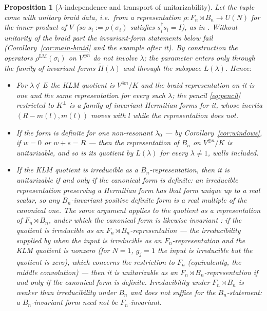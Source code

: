 \documentclass[11pt]{article}
\newtheorem{proposition}[theorem]{Proposition}
\theoremstyle{definition}
\newcommand{\Ht}{\widetilde H}
\begin{document}
\begin{proposition}[$\lambda$-independence and transport of unitarizability]
\label{prop:transport}
Let the tuple come with unitary braid data, i.e.\ from a
representation $\rho\colon F_n\rtimes B_n\to U(N)$ for the inner
product of $V$ (so $s_i:=\rho(\sigma_i)$ satisfies
$s_i^{\dagger}s_i=I$), as in \cite[Definitions~8 and 10, Lemma~3]{N-KLM}.
Without unitarity of the braid part the invariant-form statements
below fail (Corollary~\ref{cor:main-braid} and the example after it). By
construction the operators $\rho^{\mathrm{LM}}(\sigma_i)$ on
$V^{\oplus n}$ do not involve $\lambda$; the parameter enters only
through the family of invariant forms $\Ht(\lambda)$ and through the
subspace $L(\lambda)$. Hence:
\begin{itemize}
\item[(i)] For $\lambda\notin E$ the KLM quotient is $V^{\oplus n}/K$
and the braid representation on it is one and the same representation
for every such $\lambda$; the pencil \eqref{eq:pencil} restricted to
$K^{\perp}$ is a family of invariant Hermitian forms for it, whose
inertia $(R-m(l),m(l))$ moves with $l$ while the representation does not.
\item[(ii)] If the form is definite for one non-resonant $\lambda_0$
--- by Corollary~\ref{cor:windows}, if $w=0$ or $w+s=R$ --- then the
representation of $B_n$ on $V^{\oplus n}/K$ is unitarizable, and so is
its quotient by $L(\lambda)$ for every $\lambda\neq1$, walls included.
\item[(iii)] If the KLM quotient is irreducible \emph{as a
$B_n$-representation}, then it is unitarizable if and only if the
canonical form is definite: an irreducible representation preserving
a Hermitian form has that form unique up to a real scalar, so any
$B_n$-invariant positive definite form is a real multiple of the
canonical one. The same argument applies to the quotient as a
representation of $F_n\rtimes B_n$, under which the canonical form
is likewise invariant \cite[Thm.~8]{N-KLM}: if the quotient is
irreducible as an $F_n\rtimes B_n$-representation --- the
irreducibility supplied by \cite[\S4.3]{N-KLM} when the input is
irreducible as an $F_n$-representation and the KLM quotient is
nonzero (for $N=1$, $g_j=1$ the input is irreducible but the
quotient is zero), which concerns the restriction to $F_n$
(equivalently, the middle convolution) --- then
it is unitarizable as an $F_n\rtimes B_n$-representation if and only
if the canonical form is definite. Irreducibility under
$F_n\rtimes B_n$ is weaker than irreducibility under $B_n$ and does
not suffice for the $B_n$-statement: a $B_n$-invariant form need not
be $F_n$-invariant.
\end{itemize}
\end{proposition}
\end{document}
